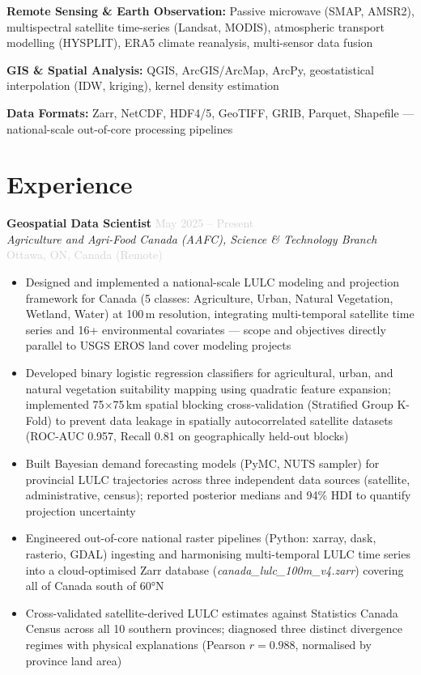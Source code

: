\documentclass[10pt, a4paper]{article}
\newcommand{\dategray}[1]{\textcolor{lightgray}{\small #1}}
\newcommand{\jobtitle}[4]{%
  \noindent\textbf{#1} \hfill \dategray{#3} \\
  \textit{#2} \hfill \dategray{#4} \\[-4pt]
}
\begin{document}
\vspace{3pt}
\noindent\textbf{Remote Sensing \& Earth Observation:} Passive microwave (SMAP,
AMSR2), multispectral satellite time-series (Landsat, MODIS), atmospheric transport
modelling (HYSPLIT), ERA5 climate reanalysis, multi-sensor data fusion

\vspace{3pt}
\noindent\textbf{GIS \& Spatial Analysis:} QGIS, ArcGIS/ArcMap, ArcPy, geostatistical
interpolation (IDW, kriging), kernel density estimation

\vspace{3pt}
\noindent\textbf{Data Formats:} Zarr, NetCDF, HDF4/5, GeoTIFF, GRIB, Parquet,
Shapefile --- national-scale out-of-core processing pipelines

\section{Experience}

\jobtitle{Geospatial Data Scientist}
         {Agriculture and Agri-Food Canada (AAFC), Science \& Technology Branch}
         {May 2025 -- Present}
         {Ottawa, ON, Canada (Remote)}
\begin{itemize}
  \item Designed and implemented a national-scale LULC modeling and projection
        framework for Canada (5 classes: Agriculture, Urban, Natural Vegetation,
        Wetland, Water) at 100\,m resolution, integrating multi-temporal satellite
        time series and 16+ environmental covariates --- scope and objectives
        directly parallel to USGS EROS land cover modeling projects
  \item Developed binary logistic regression classifiers for agricultural, urban,
        and natural vegetation suitability mapping using quadratic feature
        expansion; implemented 75$\times$75\,km spatial blocking cross-validation
        (Stratified Group K-Fold) to prevent data leakage in spatially
        autocorrelated satellite datasets (ROC-AUC 0.957, Recall 0.81 on
        geographically held-out blocks)
  \item Built Bayesian demand forecasting models (PyMC, NUTS sampler) for
        provincial LULC trajectories across three independent data sources
        (satellite, administrative, census); reported posterior medians and
        94\% HDI to quantify projection uncertainty
  \item Engineered out-of-core national raster pipelines (Python: xarray, dask,
        rasterio, GDAL) ingesting and harmonising multi-temporal LULC time series
        into a cloud-optimised Zarr database (\textit{canada\_lulc\_100m\_v4.zarr})
        covering all of Canada south of 60°N
  \item Cross-validated satellite-derived LULC estimates against Statistics Canada
        Census across all 10 southern provinces; diagnosed three distinct
        divergence regimes with physical explanations (Pearson $r = 0.988$,
        normalised by province land area)
\end{itemize}
\end{document}
